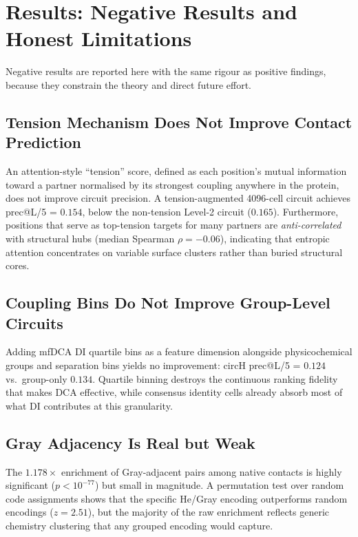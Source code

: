 \section{Results: Negative Results and Honest Limitations}
\label{sec:results-negative}

Negative results are reported here with the same rigour as positive findings,
because they constrain the theory and direct future effort.

\subsection{Tension Mechanism Does Not Improve Contact Prediction}
An attention-style ``tension'' score, defined as each position's mutual
information toward a partner normalised by its strongest coupling anywhere in
the protein, does not improve circuit precision.  A tension-augmented
4096-cell circuit achieves prec@L/5 = $0.154$, below the non-tension Level-2
circuit ($0.165$).  Furthermore, positions that serve as top-tension targets
for many partners are \emph{anti-correlated} with structural hubs (median
Spearman $\rho = -0.06$), indicating that entropic attention concentrates on
variable surface clusters rather than buried structural cores.

\subsection{Coupling Bins Do Not Improve Group-Level Circuits}
Adding mfDCA DI quartile bins as a feature dimension alongside physicochemical
groups and separation bins yields no improvement: circH prec@L/5 = $0.124$
vs.\ group-only $0.134$.  Quartile binning destroys the continuous ranking
fidelity that makes DCA effective, while consensus identity cells already
absorb most of what DI contributes at this granularity.

\subsection{Gray Adjacency Is Real but Weak}
The $1.178\times$ enrichment of Gray-adjacent pairs among native contacts is
highly significant ($p < 10^{-77}$) but small in magnitude.  A permutation
test over random code assignments shows that the specific He/Gray encoding
outperforms random encodings ($z = 2.51$), but the majority of the raw
enrichment reflects generic chemistry clustering that any grouped encoding
would capture.

